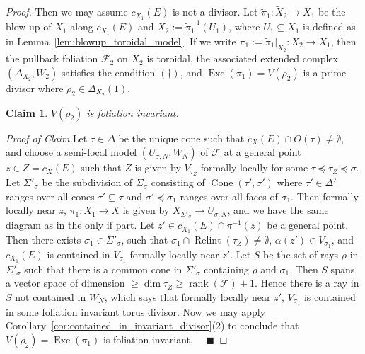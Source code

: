 \documentclass[12pt,reqno]{amsart}
\newtheorem*{claim}{Claim}
\theoremstyle{definition}
\newcommand{\on}{\operatorname}
\newenvironment{claimproof}[1]{\par\noindent\emph{Proof of Claim.}\space#1}{}
\newcommand\cF{{\mathcal{F}}}
\begin{document}
\begin{proof}
    Then we may assume $c_{X_1}(E)$ is not a divisor. 
    Let $\widetilde\pi_1\colon \widetilde X_{2}\to X_1$ be the blow-up of $X_1$ along $c_{X_1}(E)$ and $X_{2}:=\widetilde\pi_1^{-1}(U_1)$, where $U_1\subseteq X_1$ is defined as in Lemma~\ref{lem:blowup_toroidal_model}. 
    If we write $\pi_1:=\widetilde\pi_1\vert_{X_{2}}\colon X_{2}\to X_1$, then
    the pullback foliation $\cF_{2}$ on $X_{2}$ is toroidal, the associated extended complex $(\Delta_{X_{2}},W_{2})$ satisfies the condition $(\dagger)$, and $\on{Exc}(\pi_{1})=V(\rho_2)$ is a prime divisor where $\rho_2\in\Delta_{X_2}(1)$. 
    \begin{claim}
    $V(\rho_2)$ is foliation invariant.
    \end{claim}
    \begin{claimproof}
    Let $\tau\in\Delta$ be the unique cone such that $c_X(E)\cap O(\tau)\neq\emptyset$, and choose a semi-local model $(U_{\sigma,N},W_N)$ of $\cF$ at a general point $z\in Z=c_X(E)$ such that $Z$ is given by $V_{\tau_Z}$ formally locally for some $\tau\preceq\tau_Z\preceq\sigma$.  Let $\Sigma'_\sigma$ be the subdivision of $\Sigma_\sigma$ consisting of $\on{Cone}(\tau',\sigma')$ where $\tau'\in \Delta'$ ranges over all cones $\tau'\subseteq \tau$ and $\sigma'\preceq\sigma_1$ ranges over all faces of $\sigma_1$. Then formally locally near $z$, $\pi_1\colon X_1\to X$ is given by $X_{\Sigma'_\sigma}\to U_{\sigma,N}$, and we have the same diagram as in the only if part. Let $z'\in c_{X_1}(E)\cap\pi^{-1}(z)$ be a general point. Then there exists $\sigma_1\in\Sigma'_\sigma$, such that $\sigma_1\cap \on{Relint}(\tau_Z)\neq\emptyset$, $\alpha(z')\in V_{\sigma_1}$, and $c_{X_1}(E)$ is contained in $V_{\sigma_1}$ formally locally near $z'$. Let $S$ be the set of rays $\rho$ in $\Sigma'_\sigma$ such that there is a common cone in $\Sigma'_\sigma$ containing $\rho$ and $\sigma_1$. Then $S$ spans a vector space of dimension $\geq \dim \tau_Z\geq\on{rank}(\cF)+1$. Hence there is a ray in $S$ not contained in $W_N$, which says that formally locally near $z'$, $V_{\sigma_1}$ is contained in some foliation invariant torus divisor. Now we may apply Corollary~\ref{cor:contained_in_invariant_divisor}(2) to conclude that $V(\rho_2)=\on{Exc}(\pi_1)$ is foliation invariant. $\quad\blacksquare$
\end{claimproof}
    

\end{proof}
\end{document}
